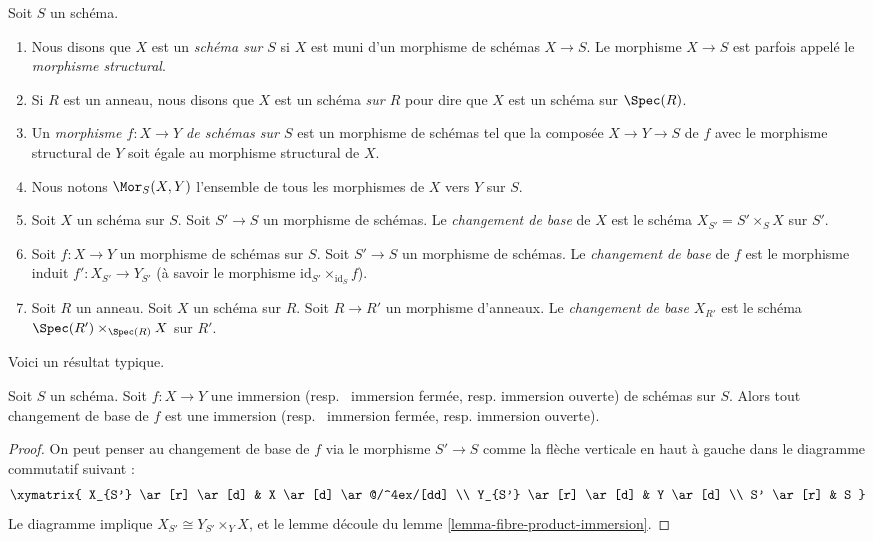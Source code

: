 \begin{definition}
\label{definition-base-change}
Soit $S$ un schéma.
\begin{enumerate}
\item Nous disons que $X$ est un {\it schéma sur $S$} si $X$ est
muni d'un morphisme de schémas $X \to S$. Le morphisme
$X \to S$ est parfois appelé le {\it morphisme
structural}. \item Si $R$ est
un anneau, nous disons que $X$
est un schéma {\it sur $R$} pour dire que
$X$ est un schéma sur $\Spec(R)$.
\item Un {\it morphisme $f : X \to Y$ de schémas sur $S$}
est un morphisme de schémas tel que la composée $X
\to Y \to S$ de $f$ avec le morphisme structural de $Y$ soit égale
au morphisme structural de $X$. \item
Nous notons $\Mor_S(X, Y)$ l'ensemble de tous les morphismes
de $X$ vers $Y$ sur $S$.
\item Soit $X$ un schéma sur $S$. Soit $S' \to S$ un morphisme
de schémas. Le {\it changement de base} de $X$
est le schéma $X_{S'} = S' \times_S X$ sur $S'$. \item
Soit $f : X \to Y$ un morphisme de schémas sur $S$. Soit $S' \to S$ un
morphisme de schémas. Le {\it changement de base} de $f$ est le
morphisme induit $f' : X_{S'} \to Y_{S'}$ (à savoir le morphisme
$\text{id}_{S'} \times_{\text{id}_S} f$). \item
Soit $R$ un anneau. Soit $X$ un schéma sur $R$. Soit $R \to
R'$ un morphisme d'anneaux. Le {\it changement de base} $X_{R'}$
est le schéma $\Spec(R') \times_{\Spec(R)} X$
sur $R'$.
\end{enumerate}
\end{definition}

\noindent
Voici un résultat typique.

\begin{lemma}
\label{lemma-base-change-immersion}
Soit $S$ un schéma. Soit $f : X \to Y$ une immersion
(resp. \ immersion fermée, resp. immersion ouverte) de
schémas sur $S$. Alors tout changement de base de $f$ est une
immersion (resp. \ immersion fermée, resp. immersion ouverte).
\end{lemma}

\begin{proof}
On peut penser au changement de base de $f$ via le morphisme $S'
\to S$ comme la flèche verticale en haut à gauche dans le diagramme
commutatif suivant :
$$
\xymatrix{
X_{S'} \ar[r] \ar[d] & X \ar[d] \ar@/^4ex/[dd] \\
Y_{S'} \ar[r] \ar[d] & Y \ar[d] \\
S' \ar[r] & S
}
$$
Le diagramme implique $X_{S'} \cong Y_{S'} \times_Y
X$, et le lemme découle du lemme \ref{lemma-fibre-product-immersion}.
\end{proof}


